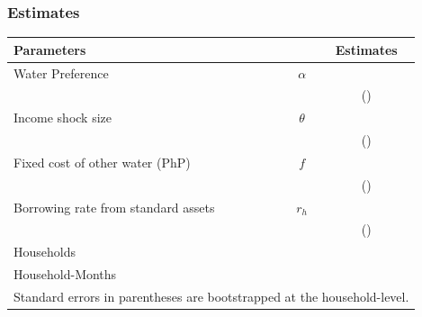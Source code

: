 \documentclass[aspectratio=149]{beamer}
\begin{document}
\begin{frame}
\frametitle{Estimates}

\begin{table}[h!]
\centering
\vspace{-2mm}
\begin{tabular}{l*{1}{cc}}
Parameters  &   & Estimates \\
\midrule
Water Preference & $\alpha$ &  \\
 &  & (\unskip) \\[.4em]
Income shock size & $\theta$ &  \\
 &  & (\unskip) \\[.4em]
Fixed cost of other water (PhP) & $f$ &   \\
 &  &  (\unskip) \\[.4em]
Borrowing rate from standard assets & $r_h$ &  \\
 &  & (\unskip) \\[.8em]
Households & &  \\
Household-Months & &  \\
\bottomrule
\multicolumn{3}{l}{\scriptsize Standard errors in parentheses are bootstrapped at the household-level.} %
\end{tabular}
\end{table}

\end{frame}
\end{document}
